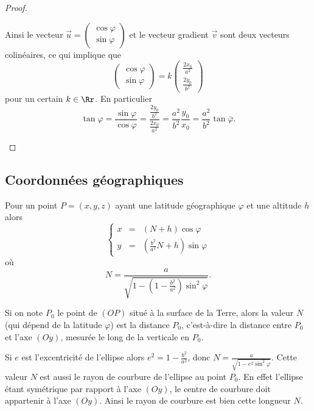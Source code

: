 \documentclass[class=report,crop=false]{standalone}
\newcommand{\vect}{\overrightarrow}
\begin{document}
\begin{proof}
\begin{enumerate}
  Ainsi le vecteur 
  $\vect u = \left(\begin{smallmatrix}\cos \varphi \\ \sin \varphi \end{smallmatrix}\right)$ et le vecteur 
  gradient $\vect v$ sont deux vecteurs colinéaires, ce qui implique que
  $$\begin{pmatrix}\cos \varphi \\ \sin \varphi \end{pmatrix} = k \begin{pmatrix}\frac{2x_0}{a^2} \\ \frac{2y_0}{b^2} \end{pmatrix}$$
  pour un certain $k\in\Rr$. En particulier 
  $$\tan \varphi = \frac{\sin\varphi}{\cos\varphi} 
  = \frac{\frac{2y_0}{b^2}}{\frac{2x_0}{a^2}} = \frac{a^2}{b^2}\frac{y_0}{x_0}= \frac{a^2}{b^2} \tan \bar\varphi.$$
\end{enumerate}

\end{proof}


\subsection{Coordonnées géographiques}


\begin{theoreme}
Pour un point $P = (x,y,z)$ ayant une latitude géographique $\varphi$ et une altitude $h$
alors
$$\left\{ 
\begin{array}{rcl}
x &=& (N+h) \cos \varphi \\
y &=& \left(\frac{b^2}{a^2}N+h\right)\sin\varphi 
\end{array}
\right.$$
où 
$$N = \frac{a}{\sqrt{1-\left(1-\frac{b^2}{a^2}\right)\sin^2 \varphi}}.$$
\end{theoreme}

Si on note $P_0$ le point de $(OP)$ situé à la surface de la Terre, alors 
la valeur $N$ (qui dépend de la latitude $\varphi$) est la distance $P_0$, c'est-à-dire la distance entre 
$P_0$ et l'axe $(Oy)$, mesurée le long de la verticale en $P_0$.




Si $e$ est l'excentricité de l'ellipse alors $e^2 = 1-\frac{b^2}{a^2}$, donc 
$N= \frac{a}{\sqrt{1-e^2\sin^2 \varphi}}$.
Cette valeur $N$ est aussi le rayon de courbure de l'ellipse au point $P_0$. En effet
l'ellipse étant symétrique par rapport à l'axe $(Oy)$, le centre de courbure doit appartenir à l'axe $(Oy)$.
Ainsi le rayon de courbure est bien cette longueur $N$.
\end{document}
